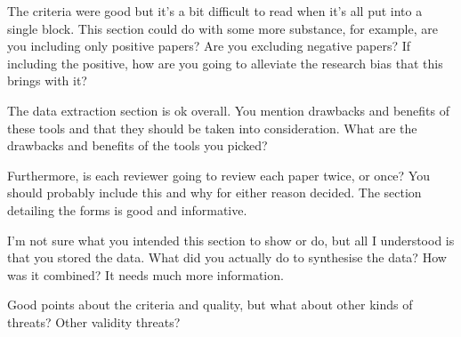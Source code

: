 \documentclass[times, 10pt,twocolumn]{article}
\begin{document}
The criteria were good but it's a bit difficult to read when it's all put into a single block. This section could do with some more substance, for example, are you including only positive papers? Are you excluding negative papers? If including the positive, how are you going to alleviate the research bias that this brings with it?

The data extraction section is ok overall. You mention drawbacks and benefits of these tools and that they should be taken into consideration. What are the drawbacks and benefits of the tools you picked?

Furthermore, is each reviewer going to review each paper twice, or once? You should probably include this and why for either reason decided. The section detailing the forms is good and informative.

I'm not sure what you intended this section to show or do, but all I understood is that you stored the data. What did you actually do to synthesise the data? How was it combined? It needs much more information.

Good points about the criteria and quality, but what about other kinds of threats? Other validity threats?
\end{document}
